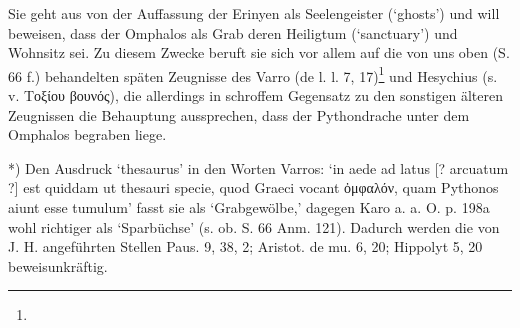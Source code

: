 \documentclass[a4paper, 11pt, oneside]{article}
\begin{document}
Sie geht aus von der Auffassung der Erinyen als Seelengeister (`ghosts') und will beweisen, dass der Omphalos als Grab deren Heiligtum (`sanctuary') und Wohnsitz sei. Zu diesem Zwecke beruft sie sich vor allem auf die von uns oben (S. 66 f.) behandelten späten Zeugnisse des Varro (de l. l. 7, 17)\footnote{} und Hesychius (s. v. Τοξίου βουνός), die allerdings in schroffem Gegensatz zu den sonstigen älteren Zeugnissen die Behauptung aussprechen, dass der Pythondrache unter dem Omphalos begraben liege.

*) Den Ausdruck `thesaurus' in den Worten Varros: `in aede ad latus [? arcuatum ?] est quiddam ut thesauri specie, quod Graeci vocant ὀμφαλόν, quam Pythonos aiunt esse tumulum' fasst sie als `Grabgewölbe,' dagegen Karo a. a. O. p. 198a wohl richtiger als `Sparbüchse' (s. ob. S. 66 Anm. 121). Dadurch werden die von J. H. angeführten Stellen Paus. 9, 38, 2; Aristot. de mu. 6, 20; Hippolyt 5, 20 beweisunkräftig.
\end{document}
